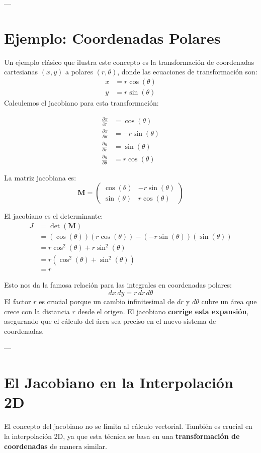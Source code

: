 \documentclass{article}
\begin{document}
---

\section*{Ejemplo: Coordenadas Polares}
Un ejemplo clásico que ilustra este concepto es la transformación de coordenadas cartesianas $(x, y)$ a polares $(r, \theta)$, donde las ecuaciones de transformación son:
\begin{align*}
x &= r \cos(\theta) \\
y &= r \sin(\theta)
\end{align*}
Calculemos el jacobiano para esta transformación:

\begin{align*}
\frac{\partial x}{\partial r} &= \cos(\theta) \\
\frac{\partial x}{\partial \theta} &= -r \sin(\theta) \\
\frac{\partial y}{\partial r} &= \sin(\theta) \\
\frac{\partial y}{\partial \theta} &= r \cos(\theta)
\end{align*}

La matriz jacobiana es:
\[
\mathbf{M} = 
\begin{pmatrix}
\cos(\theta) & -r\sin(\theta) \\
\sin(\theta) & r\cos(\theta)
\end{pmatrix}
\]

El jacobiano es el determinante:
\begin{align*}
J &= \det(\mathbf{M}) \\
&= (\cos(\theta))(r\cos(\theta)) - (-r\sin(\theta))(\sin(\theta)) \\
&= r\cos^2(\theta) + r\sin^2(\theta) \\
&= r(\cos^2(\theta) + \sin^2(\theta)) \\
&= r
\end{align*}

Esto nos da la famosa relación para las integrales en coordenadas polares:
\[
dx\,dy = r\,dr\,d\theta
\]
El factor $r$ es crucial porque un cambio infinitesimal de $dr$ y $d\theta$ cubre un área que crece con la distancia $r$ desde el origen. El jacobiano \textbf{corrige esta expansión}, asegurando que el cálculo del área sea preciso en el nuevo sistema de coordenadas.

---

\section*{El Jacobiano en la Interpolación 2D}
El concepto del jacobiano no se limita al cálculo vectorial. También es crucial en la interpolación 2D, ya que esta técnica se basa en una \textbf{transformación de coordenadas} de manera similar.
\end{document}
